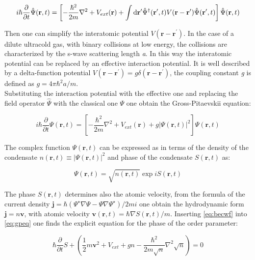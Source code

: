 \documentclass[../main.tex]{subfiles}
\begin{document}
\begin{equation}
i\hbar \frac{\partial}{\partial t} \hat{\Psi}(\textbf{r}, t) = \left[ -\frac{\hbar^2}{2m} \nabla^2 + V_{ext} (\textbf{r}) + \int \mathop{}\!\mathrm{d}{\textbf{r}^\prime} \hat{\Psi}^\dagger (\textbf{r}^\prime, t) V(\textbf{r} - \textbf{r}^\prime) \hat{\Psi} (\textbf{r}^\prime, t) \right] \hat{\Psi}(\textbf{r}, t)
\end{equation}

Then one can simplify the interatomic potential $V(\textbf{r} - \textbf{r}^\prime)$. In the case of a dilute ultracold gas, with binary collisions at low energy, the collisions are characterized by the s-wave scattering length \textit{a}. In this way the interatomic potential can be replaced by an effective interaction potential. It is well described by a delta-function potential $V(\textbf{r} - \textbf{r}^\prime) = g \delta(\textbf{r} - \textbf{r}^\prime)$, the coupling constant \textit{g} is defined as $g = 4 \pi \hbar^2 a / m$.\\
Substituting the interaction potential with the effective one and replacing the field operator $\hat{\Psi}$ with the classical one $\Psi$ one obtain the Gross-Pitaevskii equation:

\begin{equation}
i\hbar \frac{\partial}{\partial t} \Psi(\textbf{r}, t) = \left[ -\frac{\hbar^2}{2m} \nabla^2 + V_{ext} (\textbf{r}) +  g |\Psi (\textbf{r}, t)|^2 \right] \Psi(\textbf{r}, t)
\label{eq:gpeq}
\end{equation}

The complex function $\Psi(\textbf{r}, t)$ can be expressed as in terms of the density of the condensate $n(\textbf{r}, t) \equiv |\Psi(\textbf{r}, t)|^2$ and phase of the condensate $S(\textbf{r}, t)$ as:

\begin{equation}
\Psi(\textbf{r}, t) = \sqrt{n(\textbf{r}, t)} \exp{i S(\textbf{r}, t)}
\label{eq:becwf}
\end{equation}

The phase $S(\textbf{r}, t)$ determines also the atomic velocity, from the formula of the current density $\textbf{j} = \hbar (\Psi^\star \nabla \Psi - \Psi \nabla \Psi^\star) / 2mi$ one obtain the hydrodynamic form $\textbf{j} = n \textbf{v}$, with atomic velocity $\textbf{v}(\textbf{r}, t) = \hbar \nabla S(\textbf{r}, t) /m$. Inserting \ref{eq:becwf} into \ref{eq:gpeq} one finds the explicit equation for the phase of the order parameter:

\begin{equation}
\hbar \frac{\partial}{\partial t} S + \left( \frac{1}{2}m\textbf{v}^2 + V_{ext} + gn - \frac{\hbar^2}{2m\sqrt{n}} \nabla^2 \sqrt{n} \right) = 0
\label{eq:gpp}
\end{equation}
\end{document}
